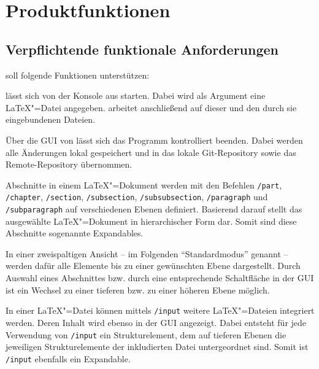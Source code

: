\clearpage

\section{Produktfunktionen}
\label{sec:produktfunktionen}
\subsection{Verpflichtende funktionale Anforderungen}
\label{subsec:verpflichtende-funktionale-anforderungen}
\texla{} soll folgende Funktionen unterstützen:


\texla{} lässt sich von der Konsole aus starten.
Dabei wird als Argument eine \LaTeX"=Datei angegeben.
\texla{} arbeitet anschließend auf dieser und den durch sie eingebundenen Dateien.


Über die GUI von \texla{} lässt sich das Programm kontrolliert beenden.
Dabei werden alle Änderungen lokal gespeichert und in das lokale Git-Repository sowie das Remote-Repository übernommen.


Abschnitte in einem \LaTeX"=Dokument werden mit den Befehlen \verb|/part|, \verb|/chapter|, \verb|/section|,
\verb|/subsection|, \verb|/subsubsection|, \verb|/paragraph| und \verb|/subparagraph| auf verschiedenen Ebenen
definiert.
Basierend darauf stellt \texla{} das ausgewählte \LaTeX"=Dokument in hierarchischer Form dar.
Somit sind diese Abschnitte sogenannte Expandables.

In einer zweispaltigen Ansicht -- im Folgenden \enquote{Standardmodus} genannt -- werden dafür alle Elemente bis zu
einer gewünschten Ebene dargestellt.
Durch Auswahl eines Abschnittes bzw. durch eine entsprechende Schaltfläche in der GUI ist ein Wechsel zu einer tieferen
bzw. zu einer höheren Ebene möglich.


In einer \LaTeX"=Datei können mittels \verb|/input| weitere \LaTeX"=Dateien integriert werden.
Deren Inhalt wird ebenso in der GUI angezeigt.
Dabei entsteht für jede Verwendung von \verb|/input| ein Strukturelement, dem auf tieferen Ebenen die jeweiligen
Strukturelemente der inkludierten Datei untergeordnet sind.
Somit ist \verb|/input| ebenfalls ein Expandable.

